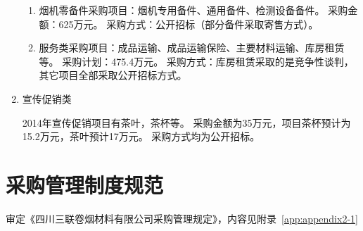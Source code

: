 \begin{enumerate}
\begin{enumerate}[1、]
  \item 烟机零备件采购项目：烟机专用备件、通用备件、检测设备备件。
采购金额：625万元。
采购方式：公开招标（部分备件采取寄售方式）。

  \item 服务类采购项目：成品运输、成品运输保险、主要材料运输、库房租赁等。
采购计划：475.4万元。
采购方式：库房租赁采取的是竞争性谈判，其它项目全部采取公开招标方式。

\end{enumerate}


 \item 宣传促销类

2014年宣传促销项目有茶叶，茶杯等。
采购金额为35万元，项目茶杯预计为15.2万元，茶叶预计17万元。
采购方式均为公开招标。
\end{enumerate}

\section{采购管理制度规范}

审定《四川三联卷烟材料有限公司采购管理规定》，内容见附录~\ref{app:appendix2-1}

